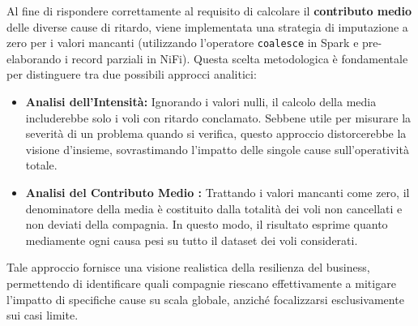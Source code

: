 \documentclass[conference]{IEEEtran}
\begin{document}
Al fine di rispondere correttamente al requisito di calcolare il \textbf{contributo medio} delle diverse cause di ritardo, viene implementata una strategia di imputazione a zero per i valori mancanti (utilizzando l'operatore \texttt{coalesce} in Spark e pre-elaborando i record parziali in NiFi).
Questa scelta metodologica è fondamentale per distinguere tra due possibili approcci analitici:
\begin{itemize}
    \item \textbf{Analisi dell'Intensità:} Ignorando i valori nulli, il calcolo della media includerebbe solo i voli con ritardo conclamato.
    Sebbene utile per misurare la severità di un problema quando si verifica, questo approccio distorcerebbe la visione d'insieme, sovrastimando l'impatto delle singole cause sull'operatività totale.
    \item \textbf{Analisi del Contributo Medio :} Trattando i valori mancanti come zero, il denominatore della media è costituito dalla totalità dei voli non cancellati e non deviati della compagnia.
    In questo modo, il risultato esprime quanto mediamente ogni causa pesi su tutto il dataset dei voli considerati.
\end{itemize}

Tale approccio fornisce una visione realistica della resilienza del business, permettendo di identificare quali compagnie riescano effettivamente a mitigare l'impatto di specifiche cause su scala globale, anziché focalizzarsi esclusivamente sui casi limite.
\end{document}
